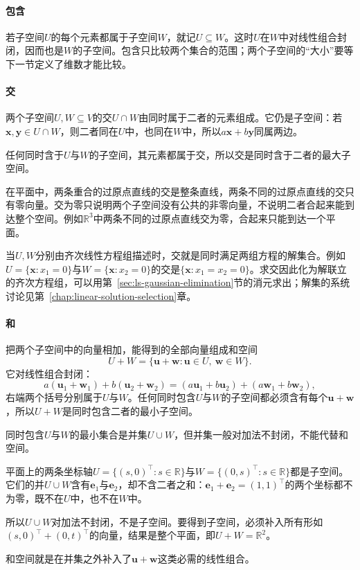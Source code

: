 \paragraph{包含}
\label{sec:ls-subspace-inclusion}
若子空间$U$的每个元素都属于子空间$W$，就记$U\subseteq W$。这时$U$在$W$中对线性组合封闭，因而也是$W$的子空间。包含只比较两个集合的范围；两个子空间的“大小”要等下一节定义了维数才能比较。

\paragraph{交}
\label{sec:ls-intersection}
两个子空间$U,W\subseteq V$的交$U\cap W$由同时属于二者的元素组成。它仍是子空间：若$\bm x,\bm y\in U\cap W$，则二者同在$U$中，也同在$W$中，所以$a\bm x+b\bm y$同属两边。

任何同时含于$U$与$W$的子空间，其元素都属于交，所以交是同时含于二者的最大子空间。

在平面中，两条重合的过原点直线的交是整条直线，两条不同的过原点直线的交只有零向量。交为零只说明两个子空间没有公共的非零向量，不说明二者合起来能到达整个空间。例如$\mathbb R^3$中两条不同的过原点直线交为零，合起来只能到达一个平面。

当$U,W$分别由齐次线性方程组描述时，交就是同时满足两组方程的解集合。例如$U=\{\bm x:x_1=0\}$与$W=\{\bm x:x_2=0\}$的交是$\{\bm x:x_1=x_2=0\}$。求交因此化为解联立的齐次方程组，可以用第~\ref{sec:ls-gaussian-elimination}节的消元求出；解集的系统讨论见第~\ref{chap:linear-solution-selection}章。

\paragraph{和}
\label{sec:ls-sum}
把两个子空间中的向量相加，能得到的全部向量组成和空间
\[
 U+W=\{\bm u+\bm w:\bm u\in U,\ \bm w\in W\}.
\]
它对线性组合封闭：
\[
 a(\bm u_1+\bm w_1)+b(\bm u_2+\bm w_2)=(a\bm u_1+b\bm u_2)+(a\bm w_1+b\bm w_2),
\]
右端两个括号分别属于$U$与$W$。任何同时包含$U$与$W$的子空间都必须含有每个$\bm u+\bm w$，所以$U+W$是同时包含二者的最小子空间。

同时包含$U$与$W$的最小集合是并集$U\cup W$，但并集一般对加法不封闭，不能代替和空间。
\begin{example}[反例：两条坐标轴的并]
\label{ex:ls-union-not-subspace}
平面上的两条坐标轴$U=\{(s,0)^\top:s\in\mathbb R\}$与$W=\{(0,s)^\top:s\in\mathbb R\}$都是子空间。它们的并$U\cup W$含有$\bm e_1$与$\bm e_2$，却不含二者之和：$\bm e_1+\bm e_2=(1,1)^\top$的两个坐标都不为零，既不在$U$中，也不在$W$中。

所以$U\cup W$对加法不封闭，不是子空间。要得到子空间，必须补入所有形如$(s,0)^\top+(0,t)^\top$的向量，结果是整个平面，即$U+W=\mathbb R^2$。
\end{example}
和空间就是在并集之外补入了$\bm u+\bm w$这类必需的线性组合。

